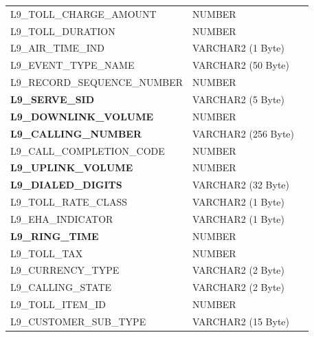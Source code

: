 \documentclass[12pt,twoside]{article}
\begin{document}
\begin{longtable}{lll}
 L9\_TOLL\_CHARGE\_AMOUNT                &  NUMBER               &                            \\
 L9\_TOLL\_DURATION                      &  NUMBER               &                            \\
 L9\_AIR\_TIME\_IND                      &  VARCHAR2 (1 Byte)    &                            \\
 L9\_EVENT\_TYPE\_NAME                   &  VARCHAR2 (50 Byte)   &                            \\
 L9\_RECORD\_SEQUENCE\_NUMBER            &  NUMBER               &                            \\
 \textbf{L9\_SERVE\_SID}                 &  VARCHAR2 (5 Byte)    &                            \\
 \textbf{L9\_DOWNLINK\_VOLUME}           &  NUMBER               &                            \\
 \textbf{L9\_CALLING\_NUMBER}            &  VARCHAR2 (256 Byte)  &                            \\
 L9\_CALL\_COMPLETION\_CODE              &  NUMBER               &                            \\
 \textbf{L9\_UPLINK\_VOLUME}             &  NUMBER               &                            \\
 \textbf{L9\_DIALED\_DIGITS}             &  VARCHAR2 (32 Byte)   &                            \\
 L9\_TOLL\_RATE\_CLASS                   &  VARCHAR2 (1 Byte)    &                            \\
 L9\_EHA\_INDICATOR                      &  VARCHAR2 (1 Byte)    &                            \\
 \textbf{L9\_RING\_TIME}                 &  NUMBER               &                            \\
 L9\_TOLL\_TAX                           &  NUMBER               &                            \\
 L9\_CURRENCY\_TYPE                      &  VARCHAR2 (2 Byte)    &                            \\
 L9\_CALLING\_STATE                      &  VARCHAR2 (2 Byte)    &                            \\
 L9\_TOLL\_ITEM\_ID                      &  NUMBER               &                            \\
 L9\_CUSTOMER\_SUB\_TYPE                 &  VARCHAR2 (15 Byte)   &                            \\

\end{longtable}
\end{document}
